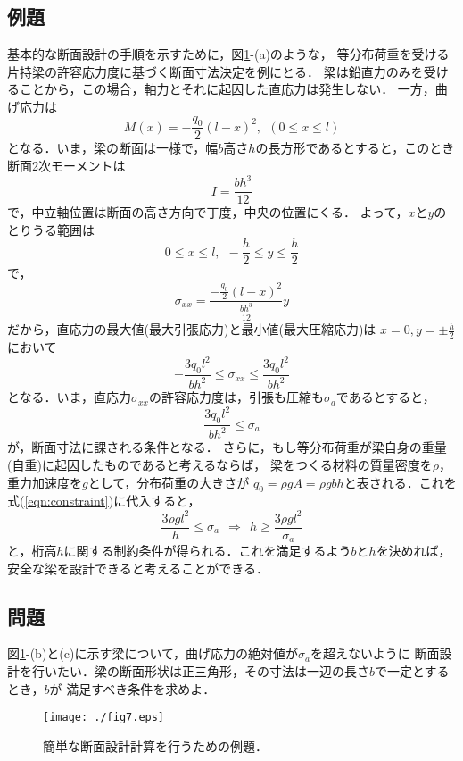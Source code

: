 \documentclass[10pt,a4j]{jarticle}
\begin{document}
\subsection{例題}
基本的な断面設計の手順を示すために，図\ref{fig:fig13_7}-(a)のような，
等分布荷重を受ける片持梁の許容応力度に基づく断面寸法決定を例にとる．
梁は鉛直力のみを受けることから，この場合，軸力とそれに起因した直応力は発生しない．
一方，曲げ応力は
\begin{equation}
	M(x)=-\frac{q_0}{2}(l-x)^2, \ \ (0 \leq x \leq l)  
\end{equation}
となる．いま，梁の断面は一様で，幅$b$高さ$h$の長方形であるとすると，このとき
断面2次モーメントは
\begin{equation}
	I=\frac{bh^3}{12}
\end{equation}
で，中立軸位置は断面の高さ方向で丁度，中央の位置にくる．
よって，$x$と$y$のとりうる範囲は
\begin{equation}
	0 \leq  x \leq l, \ \ 
	-\frac{h}{2} \leq  y \leq \frac{h}{2} 
\end{equation}
で，
\begin{equation}
	\sigma_{xx}=\frac{-\frac{q_0}{2}(l-x)^2}{\frac{bh^3}{12}}y
\end{equation}
だから，直応力の最大値(最大引張応力)と最小値(最大圧縮応力)は
$x=0, y=\pm \frac{h}{2}$において
\begin{equation}
	-\frac{3q_0l^2}{bh^2}
	\leq \sigma_{xx} \leq 
	\frac{3q_0l^2}{bh^2}
\end{equation}
となる．いま，直応力$\sigma_{xx}$の許容応力度は，引張も圧縮も$\sigma_a$であるとすると，
\begin{equation}
	\frac{3q_0l^2}{bh^2} \leq \sigma_a
	\label{eqn:constraint}
\end{equation}
が，断面寸法に課される条件となる．
さらに，もし等分布荷重が梁自身の重量(自重)に起因したものであると考えるならば，
梁をつくる材料の質量密度を$\rho$，重力加速度を$g$として，分布荷重の大きさが
$q_0=\rho g A=\rho gbh$と表される．これを式(\ref{eqn:constraint})に代入すると，
\begin{equation}
	\frac{3\rho g l^2}{h} \leq \sigma_a \ \ 
	\Rightarrow 
	\ \ 
	h \geq \frac{3\rho g l^2}{\sigma_a}
\end{equation}
と，桁高$h$に関する制約条件が得られる．これを満足するよう$b$と$h$を決めれば，
安全な梁を設計できると考えることができる．
\subsection{問題}
図\ref{fig:fig13_7}-(b)と(c)に示す梁について，曲げ応力の絶対値が$\sigma_a$を超えないように
断面設計を行いたい．梁の断面形状は正三角形，その寸法は一辺の長さ$b$で一定とするとき，$b$が
満足すべき条件を求めよ．
\begin{figure}[h]
	\begin{center}
	\texttt{[image: ./fig7.eps]} 
	\end{center}
	\caption{
		簡単な断面設計計算を行うための例題．
	} 
	\label{fig:fig13_7}
\end{figure}
\end{document}
